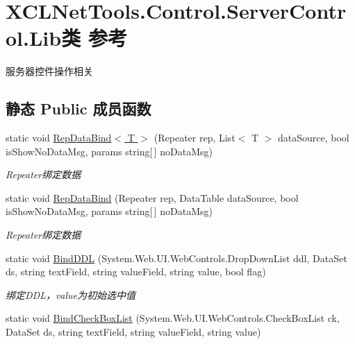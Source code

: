 \hypertarget{class_x_c_l_net_tools_1_1_control_1_1_server_control_1_1_lib}{}\section{X\+C\+L\+Net\+Tools.\+Control.\+Server\+Control.\+Lib类 参考}
\label{class_x_c_l_net_tools_1_1_control_1_1_server_control_1_1_lib}


服务器控件操作相关  


\subsection*{静态 Public 成员函数}
\begin{DoxyCompactItemize}
\item 
static void \hyperlink{class_x_c_l_net_tools_1_1_control_1_1_server_control_1_1_lib_a788673e8352bff030ce50d1b42cfd44f}{Rep\+Data\+Bind$<$ T $>$} (Repeater rep, List$<$ T $>$ data\+Source, bool is\+Show\+No\+Data\+Msg, params string\mbox{[}$\,$\mbox{]} no\+Data\+Msg)
\begin{DoxyCompactList}\small\item\em Repeater绑定数据 \end{DoxyCompactList}\item 
static void \hyperlink{class_x_c_l_net_tools_1_1_control_1_1_server_control_1_1_lib_ad2856902e5c392c722a55c82d9977586}{Rep\+Data\+Bind} (Repeater rep, Data\+Table data\+Source, bool is\+Show\+No\+Data\+Msg, params string\mbox{[}$\,$\mbox{]} no\+Data\+Msg)
\begin{DoxyCompactList}\small\item\em Repeater绑定数据 \end{DoxyCompactList}\item 
static void \hyperlink{class_x_c_l_net_tools_1_1_control_1_1_server_control_1_1_lib_a7d5141c14830a52c7d4edcab2d104452}{Bind\+D\+DL} (System.\+Web.\+U\+I.\+Web\+Controls.\+Drop\+Down\+List ddl, Data\+Set ds, string text\+Field, string value\+Field, string value, bool flag)
\begin{DoxyCompactList}\small\item\em 绑定\+D\+D\+L，value为初始选中值 \end{DoxyCompactList}\item 
static void \hyperlink{class_x_c_l_net_tools_1_1_control_1_1_server_control_1_1_lib_af2a5dcd9fa457696d15a072e4772b861}{Bind\+Check\+Box\+List} (System.\+Web.\+U\+I.\+Web\+Controls.\+Check\+Box\+List ck, Data\+Set ds, string text\+Field, string value\+Field, string value)

\end{DoxyCompactItemize}
